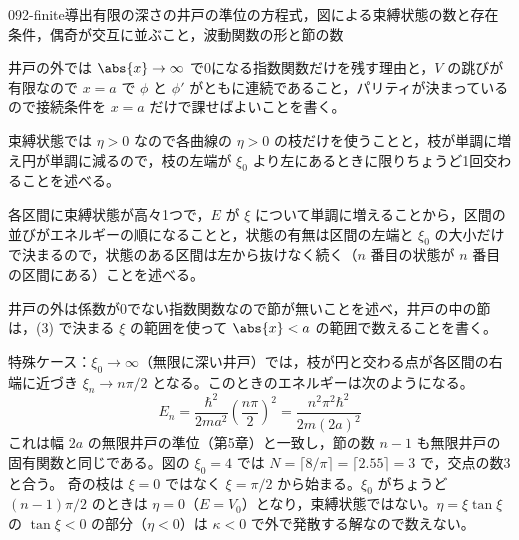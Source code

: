 \documentclass[uplatex,dvipdfmx,a4paper,11pt]{jsarticle}
\begin{document}
\begin{mondai}{092-finite}{導出}{有限の深さの井戸の準位の方程式，図による束縛状態の数と存在条件，偶奇が交互に並ぶこと，波動関数の形と節の数}
\begin{tadashii}
\begin{ronten}
  \item {} 井戸の外では $\abs{x}\to\infty$ で0になる指数関数だけを残す理由と，$V$ の跳びが有限なので $x=a$ で $\phi$ と $\phi'$ がともに連続であること，パリティが決まっているので接続条件を $x=a$ だけで課せばよいことを書く。
  \item {} 束縛状態では $\eta>0$ なので各曲線の $\eta>0$ の枝だけを使うことと，枝が単調に増え円が単調に減るので，枝の左端が $\xi_{0}$ より左にあるときに限りちょうど1回交わることを述べる。
  \item {} 各区間に束縛状態が高々1つで，$E$ が $\xi$ について単調に増えることから，区間の並びがエネルギーの順になることと，状態の有無は区間の左端と $\xi_{0}$ の大小だけで決まるので，状態のある区間は左から抜けなく続く（$n$ 番目の状態が $n$ 番目の区間にある）ことを述べる。
  \item {} 井戸の外は係数が0でない指数関数なので節が無いことを述べ，井戸の中の節は，(3) で決まる $\xi$ の範囲を使って $\abs{x}<a$ の範囲で数えることを書く。
\end{ronten}
\kenzan 特殊ケース：$\xi_{0}\to\infty$（無限に深い井戸）では，枝が円と交わる点が各区間の右端に近づき $\xi_{n}\to n\pi/2$ となる。このときのエネルギーは次のようになる。
\[ E_{n}=\frac{\hbar^{2}}{2ma^{2}}\left(\frac{n\pi}{2}\right)^{2}=\frac{n^{2}\pi^{2}\hbar^{2}}{2m(2a)^{2}} \]
これは幅 $2a$ の無限井戸の準位（第5章）と一致し，節の数 $n-1$ も無限井戸の固有関数と同じである。図の $\xi_{0}=4$ では $N=\lceil 8/\pi\rceil=\lceil 2.55\rceil=3$ で，交点の数3と合う。
\tsumazuki 奇の枝は $\xi=0$ ではなく $\xi=\pi/2$ から始まる。$\xi_{0}$ がちょうど $(n-1)\pi/2$ のときは $\eta=0$（$E=V_{0}$）となり，束縛状態ではない。$\eta=\xi\tan\xi$ の $\tan\xi<0$ の部分（$\eta<0$）は $\kappa<0$ で外で発散する解なので数えない。
\end{tadashii}
\end{mondai}
\end{document}

